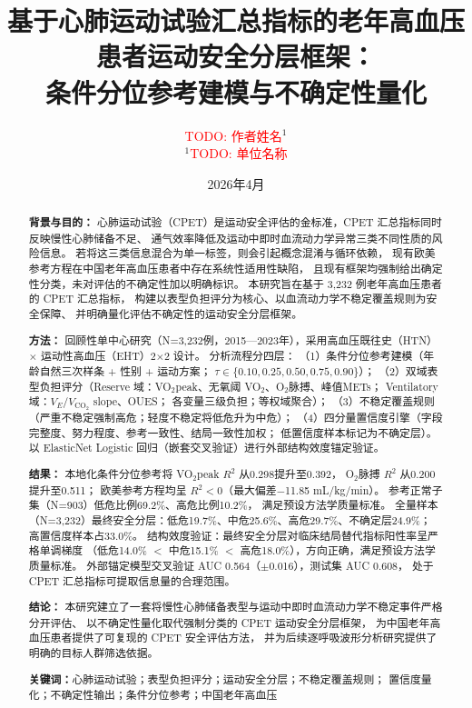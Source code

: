 \documentclass[12pt, a4paper]{ctexart}
\title{基于心肺运动试验汇总指标的老年高血压患者运动安全分层框架：\\
\large 条件分位参考建模与不确定性量化}
\author{\textcolor{red}{TODO: 作者姓名}$^{1}$\\
\small$^{1}$\textcolor{red}{TODO: 单位名称}}
\date{2026年4月}
\begin{document}
\maketitle

\begin{abstract}
\textbf{背景与目的：}
心肺运动试验（CPET）是运动安全评估的金标准，CPET 汇总指标同时反映慢性心肺储备不足、
通气效率降低及运动中即时血流动力学异常三类不同性质的风险信息。
若将这三类信息混合为单一标签，则会引起概念混淆与循环依赖，
现有欧美参考方程在中国老年高血压患者中存在系统性适用性缺陷，
且现有框架均强制给出确定性分类，未对评估的不确定性加以明确标识。
本研究旨在基于 3,232 例老年高血压患者的 CPET 汇总指标，
构建以表型负担评分为核心、以血流动力学不稳定覆盖规则为安全保障、
并明确量化评估不确定性的运动安全分层框架。

\textbf{方法：}
回顾性单中心研究（N=3,232例，2015—2023年），采用高血压既往史（HTN）$\times$ 运动性高血压（EHT）2$\times$2 设计。
分析流程分四层：
（1）条件分位参考建模（年龄自然三次样条 + 性别 + 运动方案；
$\tau \in \{0.10, 0.25, 0.50, 0.75, 0.90\}$）；
（2）双域表型负担评分（Reserve 域：VO$_2$peak、无氧阈 VO$_2$、O$_2$脉搏、峰值METs；
Ventilatory 域：$V_E/V_{\text{CO}_2}$ slope、OUES；
各变量三级负担；等权域聚合）；
（3）不稳定覆盖规则（严重不稳定强制高危；轻度不稳定将低危升为中危）；
（4）四分量置信度引擎（字段完整度、努力程度、参考一致性、结局一致性加权；
低置信度样本标记为不确定层）。
以 ElasticNet Logistic 回归（嵌套交叉验证）进行外部结构效度锚定验证。

\textbf{结果：}
本地化条件分位参考将 VO$_2$peak $R^2$ 从0.298提升至0.392，
O$_2$脉搏 $R^2$ 从0.200提升至0.511；
欧美参考方程均呈 $R^2<0$（最大偏差$-$11.85 mL/kg/min）。
参考正常子集（N=903）低危比例69.2\%、高危比例10.2\%，
满足预设方法学质量标准。
全量样本（N=3,232）最终安全分层：低危19.7\%、中危25.6\%、高危29.7\%、不确定层24.9\%；
高置信度样本占33.0\%。
结构效度验证：最终安全分层对临床结局替代指标阳性率呈严格单调梯度
（低危14.0\% $<$ 中危15.1\% $<$ 高危18.0\%），方向正确，满足预设方法学质量标准。
外部锚定模型交叉验证 AUC 0.564（$\pm$0.016），测试集 AUC 0.608，
处于 CPET 汇总指标可提取信息量的合理范围。

\textbf{结论：}
本研究建立了一套将慢性心肺储备表型与运动中即时血流动力学不稳定事件严格分开评估、
以不确定性量化取代强制分类的 CPET 运动安全分层框架，
为中国老年高血压患者提供了可复现的 CPET 安全评估方法，
并为后续逐呼吸波形分析研究提供了明确的目标人群筛选依据。

\textbf{关键词：}心肺运动试验；表型负担评分；运动安全分层；不稳定覆盖规则；
置信度量化；不确定性输出；条件分位参考；中国老年高血压
\end{abstract}
\end{document}
